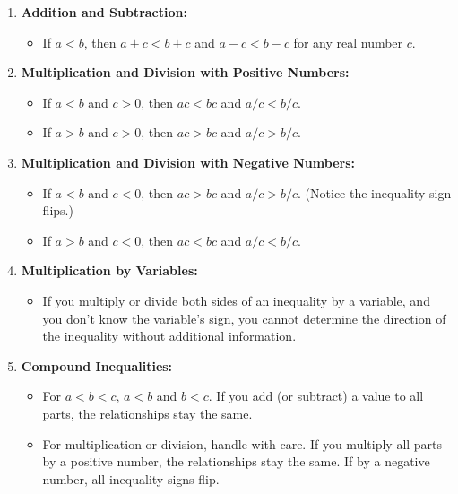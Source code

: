 \documentclass{report}
\begin{document}
      \begin{enumerate}
        \item \textbf{Addition and Subtraction:}
        \begin{itemize}
            \item If \(a < b\), then \(a + c < b + c\) and \(a - c < b - c\) for any real number \(c\).
        \end{itemize}
        
        \item \textbf{Multiplication and Division with Positive Numbers:}
        \begin{itemize}
            \item If \(a < b\) and \(c > 0\), then \(ac < bc\) and \(a/c < b/c\).
            \item If \(a > b\) and \(c > 0\), then \(ac > bc\) and \(a/c > b/c\).
        \end{itemize}

        \item \textbf{Multiplication and Division with Negative Numbers:}
        \begin{itemize}
            \item If \(a < b\) and \(c < 0\), then \(ac > bc\) and \(a/c > b/c\). (Notice the inequality sign flips.)
            \item If \(a > b\) and \(c < 0\), then \(ac < bc\) and \(a/c < b/c\).
        \end{itemize}

        \item \textbf{Multiplication by Variables:}
        \begin{itemize}
            \item If you multiply or divide both sides of an inequality by a variable, and you don't know the variable's sign, you cannot determine the direction of the inequality without additional information.
        \end{itemize}

        \item \textbf{Compound Inequalities:}
        \begin{itemize}
            \item For \(a < b < c\), \(a < b\) and \(b < c\). If you add (or subtract) a value to all parts, the relationships stay the same.
            \item For multiplication or division, handle with care. If you multiply all parts by a positive number, the relationships stay the same. If by a negative number, all inequality signs flip.
        \end{itemize}


\end{enumerate}
\end{document}
